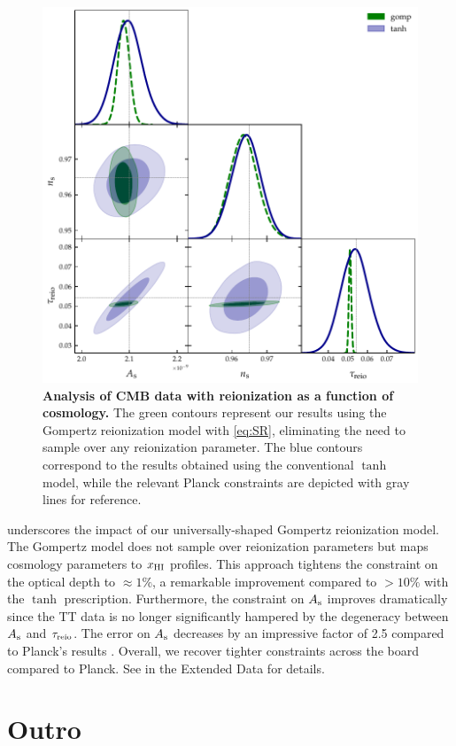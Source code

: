 \begin{figure}
\centering
\includegraphics[width=0.6\linewidth]{figs/gomp_tanh_triangle_kill.pdf}
\caption{\textbf{Analysis of CMB data with reionization as a function of
cosmology.}
The green contours represent our results using the Gompertz reionization
model with \cref{eq:SR}, eliminating the need to sample over any
reionization parameter.
The blue contours correspond to the results obtained using the
conventional $\tanh$ model, while the relevant Planck constraints
\cite{Planck2020a} are depicted with gray lines for reference.}
\label{fig:kill}
\end{figure}

 underscores the impact of our universally-shaped
Gompertz reionization model.
The Gompertz model does not sample over reionization parameters but
maps cosmology parameters to $x_{\mathrm{HI}}$ profiles.
This approach tightens the constraint on the optical depth to $\approx
1\%$, a remarkable improvement compared to $> 10\%$ with the $\tanh$
prescription.
Furthermore, the constraint on $A_\mathrm{s}$ improves dramatically since the TT
data is no longer significantly hampered by the degeneracy between $A_\mathrm{s}$
and $\tau_{\mathrm{reio}}$.
The error on $A_\mathrm{s}$ decreases by an impressive factor of 2.5 compared to
Planck's results \cite{Planck2020a}.
Overall, we recover tighter constraints across the board compared to
Planck.
See  in the Extended Data for details.


\section*{Outro}

